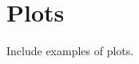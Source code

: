 \documentclass[11pt]{article}
\begin{document}
\newpage


\section{Plots}

Include examples of plots.



% 
% 
\end{document}
